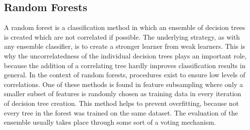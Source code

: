 \subsection{Random Forests}\label{subsec:random_forests}
\enlargethispage{2cm}
A random forest is a classification method in which an ensemble of decision trees is created which are not correlated if possible. The underlying strategy, as with any ensemble classifier, is to create a stronger learner from weak learners. This is why the uncorrelatedness of the individual decision trees plays an important role, because the addition of a correlating tree hardly improves classification results in general. In the context of random forests, procedures exist to ensure low levels of correlations. One of these methods is found in feature subsampling where only a smaller subset of features is randomly chosen as training data in every iteration of decision tree creation. This method helps to prevent overfitting, because not every tree in the forest was trained on the same dataset. The evaluation of the ensemble usually takes place through some sort of a voting mechanism.  \cite{Jiang}

